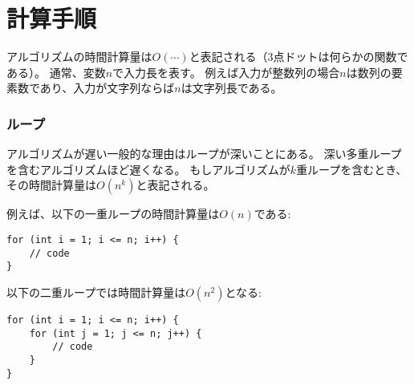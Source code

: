 \section{計算手順}

アルゴリズムの時間計算量は$O(\cdots)$と表記される（3点ドットは何らかの関数である）。
通常、変数$n$で入力長を表す。
例えば入力が整数列の場合$n$は数列の要素数であり、入力が文字列ならば$n$は文字列長である。

\begin{comment}
\subsubsection*{Loops}

A common reason why an algorithm is slow is
that it contains many loops that go through the input.
The more nested loops the algorithm contains,
the slower it is.
If there are $k$ nested loops,
the time complexity is $O(n^k)$.

For example, the time complexity of the following code is $O(n)$:
\end{comment}

\subsubsection*{ループ}

アルゴリズムが遅い一般的な理由はループが深いことにある。
深い多重ループを含むアルゴリズムほど遅くなる。
もしアルゴリズムが$k$重ループを含むとき、その時間計算量は$O(n^k)$と表記される。

例えば、以下の一重ループの時間計算量は$O(n)$である:

\begin{lstlisting}
for (int i = 1; i <= n; i++) {
    // code
}
\end{lstlisting}

\begin{comment}
And the time complexity of the following code is $O(n^2)$:
\end{comment}
以下の二重ループでは時間計算量は$O(n^2)$となる:

\begin{lstlisting}
for (int i = 1; i <= n; i++) {
    for (int j = 1; j <= n; j++) {
        // code
    }
}
\end{lstlisting}

\begin{comment}
\subsubsection*{Order of magnitude}

A time complexity does not tell us the exact number
of times the code inside a loop is executed,
but it only shows the order of magnitude.
In the following examples, the code inside the loop
is executed $3n$, $n+5$ and $\lceil n/2 \rceil$ times,
but the time complexity of each code is $O(n)$.
\end{comment}

